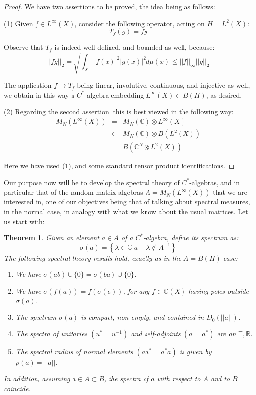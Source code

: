 \documentclass[12pt]{amsbook}
\newtheorem{theorem}{Theorem}[chapter]
\begin{document}
\begin{proof}
We have two assertions to be proved, the idea being as follows:

\medskip

(1) Given $f\in L^\infty(X)$, consider the following operator, acting on $H=L^2(X)$:
$$T_f(g)=fg$$

Observe that $T_f$ is indeed well-defined, and bounded as well, because:
$$||fg||_2
=\sqrt{\int_X|f(x)|^2|g(x)|^2d\mu(x)}
\leq||f||_\infty||g||_2$$

The application $f\to T_f$ being linear, involutive, continuous, and injective as well, we obtain in this way a $C^*$-algebra embedding $L^\infty(X)\subset B(H)$, as desired.

\medskip

(2) Regarding the second assertion, this is best viewed in the following way:
\begin{eqnarray*}
M_N(L^\infty(X))
&=&M_N(\mathbb C)\otimes L^\infty(X)\\
&\subset&M_N(\mathbb C)\otimes B(L^2(X))\\
&=&B\left(\mathbb C^N\otimes L^2(X)\right)
\end{eqnarray*}

Here we have used (1), and some standard tensor product identifications.
\end{proof}

Our purpose now will be to develop the spectral theory of $C^*$-algebras, and in particular that of the random matrix algebras $A=M_N(L^\infty(X))$ that we are interested in, one of our objectives being that of talking about spectral measures, in the normal case, in analogy with what we know about the usual matrices. Let us start with:

\begin{theorem}
Given an element $a\in A$ of a $C^*$-algebra, define its spectrum as:
$$\sigma(a)=\left\{\lambda\in\mathbb C\Big|a-\lambda\notin A^{-1}\right\}$$
The following spectral theory results hold, exactly as in the $A=B(H)$ case:
\begin{enumerate}
\item We have $\sigma(ab)\cup\{0\}=\sigma(ba)\cup\{0\}$.

\item We have $\sigma(f(a))=f(\sigma(a))$, for any $f\in\mathbb C(X)$ having poles outside $\sigma(a)$.

\item The spectrum $\sigma(a)$ is compact, non-empty, and contained in $D_0(||a||)$.

\item The spectra of unitaries $(u^*=u^{-1})$ and self-adjoints $(a=a^*)$ are on $\mathbb T,\mathbb R$.

\item The spectral radius of normal elements $(aa^*=a^*a)$ is given by $\rho(a)=||a||$.
\end{enumerate}
In addition, assuming $a\in A\subset B$, the spectra of $a$ with respect to $A$ and to $B$ coincide.
\end{theorem}
\end{document}
